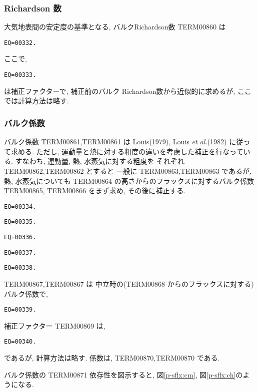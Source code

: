 \subsubsection{Richardson 数}

大気地表間の安定度の基準となる,
バルクRichardson数 TERM00860 は
%
\begin{verbatim}
EQ=00332.
\end{verbatim}
ここで, 
\begin{verbatim}
EQ=00333.
\end{verbatim}
は補正ファクターで, 補正前のバルク Richardson数から近似的に求めるが, 
ここでは計算方法は略す. 

\subsubsection{バルク係数}

バルク係数 TERM00861,TERM00861 は
Louis(1979), Louis {\em et al.}(1982) に従って求める. 
ただし, 運動量と熱に対する粗度の違いを考慮した補正を行なっている. 
すなわち, 運動量, 熱, 水蒸気に対する粗度を
それぞれ TERM00862,TERM00862 とすると
一般に TERM00863,TERM00863 であるが, 熱, 水蒸気についても
TERM00864 の高さからのフラックスに対するバルク係数
TERM00865, TERM00866 をまず求め, その後に補正する. 
%
\begin{verbatim}
EQ=00334.
\end{verbatim}
%
\begin{verbatim}
EQ=00335.
\end{verbatim}
\begin{verbatim}
EQ=00336.
\end{verbatim}
%
\begin{verbatim}
EQ=00337.
\end{verbatim}
\begin{verbatim}
EQ=00338.
\end{verbatim}

TERM00867,TERM00867 は
中立時の(TERM00868 からのフラックスに対する)バルク係数で,
%
\begin{verbatim}
EQ=00339.
\end{verbatim}

補正ファクター TERM00869 は, 
\begin{verbatim}
EQ=00340.
\end{verbatim}
であるが, 計算方法は略す. 
係数は, TERM00870,TERM00870 である. 

バルク係数の TERM00871 依存性を図示すると,
図\ref{p-sflx:cm}, 図\ref{p-sflx:ch}のようになる.

